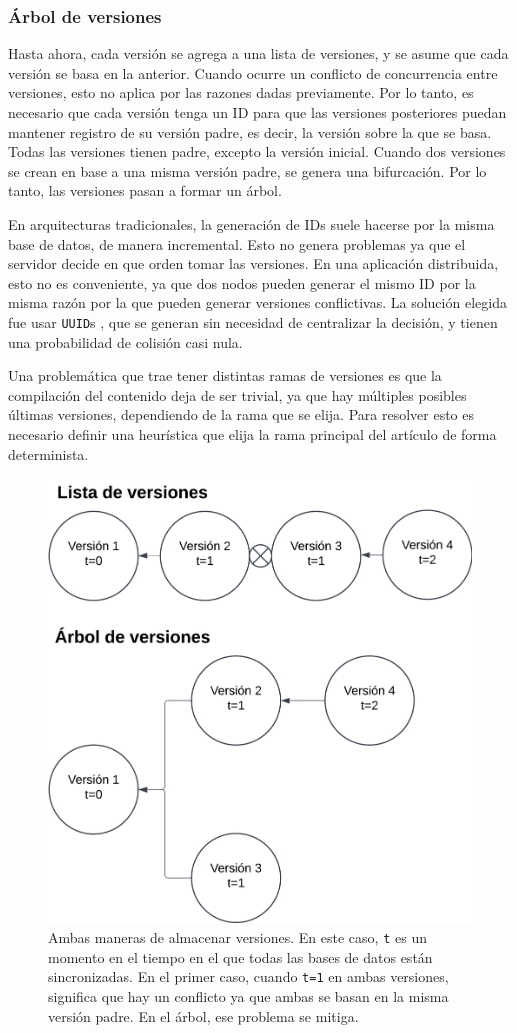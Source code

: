 \subsubsection{Árbol de versiones}

Hasta ahora, cada versión se agrega a una lista de versiones, y se asume que cada versión se basa en la anterior. Cuando ocurre un conflicto de concurrencia entre versiones, esto no aplica por las razones dadas previamente. Por lo tanto, es necesario que cada versión tenga un ID para que las versiones posteriores puedan mantener registro de su versión padre, es decir, la versión sobre la que se basa. Todas las versiones tienen padre, excepto la versión inicial. Cuando dos versiones se crean en base a una misma versión padre, se genera una bifurcación. Por lo tanto, las versiones pasan a formar un árbol.

En arquitecturas tradicionales, la generación de IDs suele hacerse por la misma base de datos, de manera incremental. Esto no genera problemas ya que el servidor decide en que orden tomar las versiones. En una aplicación distribuida, esto no es conveniente, ya que dos nodos pueden generar el mismo ID por la misma razón por la que pueden generar versiones conflictivas. La solución elegida fue usar \texttt{UUID}s \cite{uuid}, que se generan sin necesidad de centralizar la decisión, y tienen una probabilidad de colisión casi nula.

Una problemática que trae tener distintas ramas de versiones es que la compilación del contenido deja de ser trivial, ya que hay múltiples posibles últimas versiones, dependiendo de la rama que se elija. Para resolver esto es necesario definir una heurística que elija la rama principal del artículo de forma determinista.

\begin{figure}[H]
    \centering
    \includegraphics[width=0.5\linewidth]{img/solucion-wiki/arbol-versiones.png}
    \caption{Ambas maneras de almacenar versiones. En este caso, \texttt{t} es un momento en el tiempo en el que todas las bases de datos están sincronizadas. En el primer caso, cuando \texttt{t=1} en ambas versiones, significa que hay un conflicto ya que ambas se basan en la misma versión padre. En el árbol, ese problema se mitiga.}
    \label{fig:versions-tree}
\end{figure}

